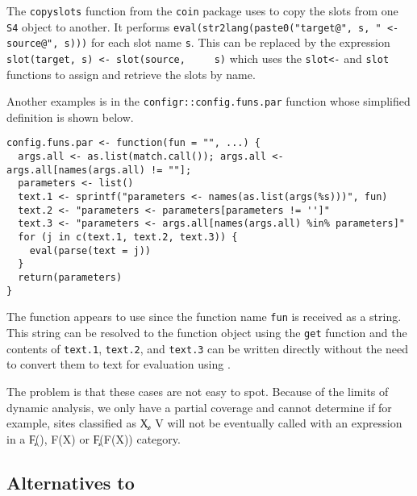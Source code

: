 \documentclass[screen,acmsmall]{acmart}%
\newcommand{\code}[1]{\lstinline |#1|\xspace}
\begin{document}
  The \code{copyslots} function from the \code{coin} package uses \eval to copy the
  slots from one \code{S4} object to another. It performs
  \code{eval(str2lang(paste0("target@", s, " <- source@", s)))} for each slot name
  \code{s}. This can be replaced by the expression \code{slot(target, s) <- slot(source,
    s)} which uses the \code{slot<-} and \code{slot} functions to assign and retrieve
  the slots by name.

  Another examples is in the \code{configr::config.funs.par} function whose
  simplified definition is shown below.

\begin{lstlisting}
config.funs.par <- function(fun = "", ...) {
  args.all <- as.list(match.call()); args.all <- args.all[names(args.all) != ""];
  parameters <- list()
  text.1 <- sprintf("parameters <- names(as.list(args(%s)))", fun)
  text.2 <- "parameters <- parameters[parameters != '']"
  text.3 <- "parameters <- args.all[names(args.all) %in% parameters]"
  for (j in c(text.1, text.2, text.3)) {
    eval(parse(text = j))
  }
  return(parameters)
}
\end{lstlisting}

  The function appears to use \eval since the function name \code{fun} is received
  as a string. This string can be resolved to the function object using the
  \code{get} function and the contents of \code{text.1}, \code{text.2}, and \code{text.3}
  can be written directly without the need to convert them to text for
  evaluation using \eval.


The problem is that these cases are not easy to spot. Because of the
limits of dynamic analysis, we only have a partial coverage and cannot determine
if for example, \eval sites classified as \c{X, V} will not be eventually called
with an expression in a \c{F(), F(X)} or \c{F(F(X))} category.


\subsection{Alternatives to \eval}
\end{document}
